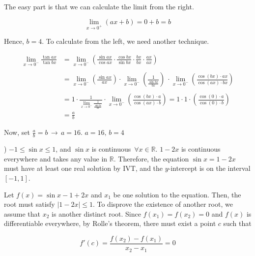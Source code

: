 \documentclass{article}
\begin{document}
\hfill

\noindent The easy part is that we can calculate the limit from the right.

\begin{equation*}
\lim_{x\to0^+} (ax+b) = 0+b = b
\end{equation*}

\hfill

\noindent Hence, $b=4$. To calculate from the left, we need another technique.

\begin{align*}
\lim_{x\to0^-} \frac{\tan ax}{\tan bx} &= \lim_{x\to0^-} \left(\frac{\sin ax}{\cos ax} \cdot \frac{\cos bx}{\sin bx} \cdot \frac{bx}{bx}\cdot \frac{ax}{ax}\right)\\\\&=\lim_{x\to0^-} \left(\frac{\sin ax}{ax} \right)\cdot \lim_{x\to0^-} \left(\frac1{ \frac{\sin bx}{bx}}\right)\ \cdot \lim_{x\to0^-} \left(\frac{\cos (bx) \cdot ax}{\cos(ax) \cdot bx}\right)\\\\&=1\cdot  \frac1{\displaystyle \lim_{x\to0^-} \frac1{ \frac{\sin bx}{bx}} }\cdot \lim_{x\to0^-} \left(\frac{\cos (bx) \cdot a}{\cos(ax) \cdot b}\right)= 1\cdot 1\cdot\left(\frac{\cos(0) \cdot a}{\cos(0) \cdot b}\right)\\&=\frac ab
\end{align*}

\hfill

\noindent Now, set $\displaystyle \frac ab = b\,\rightarrow\, a= 16$. $\boxed{a=16,\,b=4}$

\hfill

) $-1 \leq \sin x\leq 1$, and $\sin x$ is continuous $\, \forall x\in \mathbb{R}$. $1-2x$ is continuous everywhere and takes any value in $\mathbb{R}$. Therefore, the equation $\sin x=1-2x$ must have at least one real solution by IVT, and the $y$-intercept is on the interval $[-1, 1]$.

\hfill

\noindent Let $f(x) = \sin x - 1 + 2x$ and $x_1$ be one solution to the equation. Then, the root must satisfy $|1-2x| \leq 1$. To disprove the existence of another root, we assume that $x_2$ is another distinct root. Since $f(x_1) = f(x_2) = 0$ and $f(x)$ is differentiable everywhere, by Rolle's theorem, there must exist a point $c$ such that

\begin{equation*}
f'(c) = \frac{f(x_2) -f(x_1)}{x_2-x_1} = 0
\end{equation*}
\end{document}
